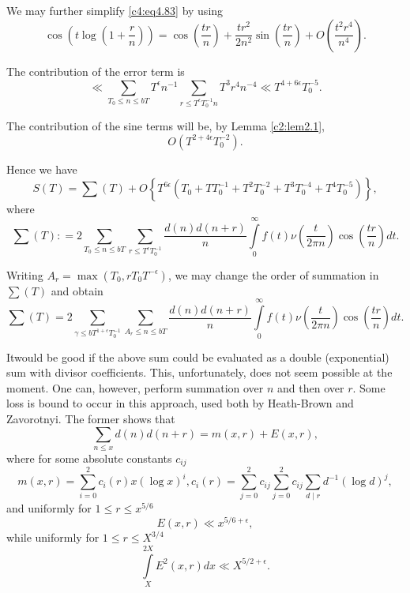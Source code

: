 We may further simplify \eqref{c4:eq4.83} by using
$$
\cos \left(t \log \left(1+ \frac{r}{n}\right) \right) = \cos
\left(\frac{tr}{n} \right) + \frac{tr^2}{2n^2} \sin \left(\frac{tr}{n}
\right) + O \left(\frac{t^2 r^4}{n^4} \right).
$$

The contribution of the error term is 
$$
\ll \sum_{T_0 \leq n \leq bT} T^\epsilon n^{-1} \sum_{r \leq
  T^\epsilon T_0^{-1} n} T^3 r^4 n^{-4} \ll T^{4+ 6 \epsilon} T_0^{-5}. 
$$

The contribution of the sine terms will be, by Lemma \ref{c2:lem2.1},
$$
O(T^{2 + 4\epsilon} T^{-2}_0).
$$ 

Hence we have
{\fontsize{10pt}{12pt}\selectfont
\begin{equation}
  S(T) = \sum (T) + O\left\{ T^{6 \epsilon} \left(T_0 + TT_0^{-1} + T^2
  T_0^{-2} + T^3 T_0^{-4} + T^4 T^{-5}_0\right)\right\}, \label{c4:eq4.84}
\end{equation}}
where
{\fontsize{10pt}{12pt}\selectfont
\begin{equation}
  \sum(T) : = 2 \sum_{T_0 \leq n \leq b T} \sum_{r \leq T^\epsilon
    T_0^{-1}} \frac{d(n) d(n+r)}{n} \int\limits_0^\infty f(t) \nu
  \left(\frac{t}{2 \pi n} \right) \cos \left(\frac{tr}{n}
  \right)dt.\label{c4:eq4.85} 
\end{equation}}

Writing $A_r = \max (T_0, rT_0 T^{-\epsilon})$, we may change the
order of summation in $\sum (T)$ and obtain 
{\fontsize{10pt}{12pt}\selectfont
\begin{equation}
  \sum(T) = 2 \sum_{\gamma \leq b T^{1+ \epsilon} T_0^{-1}} \sum_{A_r
    \leq n \leq b T} \frac{d(n) d (n+r)}{n} \int\limits_0^\infty f(t)
  \nu \left(\frac{t}{2 \pi n} \right) \cos \left(\frac{tr}{n}\right)
  dt.\label{c4:eq4.86}
\end{equation}}

It\pageoriginale would be good if the above sum could be evaluated as
a double (exponential) sum with divisor coefficients. This,
unfortunately, does not seem possible at the moment. One can, however,
perform summation over $n$ and then over $r$. Some loss is bound to
occur in this approach, used both by Heath-Brown and Zavorotnyi. The
former shows that
$$
\sum_{n \leq x} d(n) d(n+r) = m (x, r) + E(x, r),
$$
where for some absolute constants $c_{ij}$
$$
m (x, r) = \sum_{i=0}^2 c_i (r) x (\log x)^i, c_i (r) = \sum^2_{j=0}
c_{ij} \sum_{j=0}^2 c_{ij} \sum_{d \mid r} d^{-1} (\log d)^j,
$$
and uniformly for $1 \leq r \leq x^{5/6}$
\begin{equation}
  E(x, r) \ll x^{5/6+\epsilon}, \label{c4:eq4.87}
\end{equation}
while uniformly for $1 \leq r \leq X^{3/4}$
\begin{equation}
  \int\limits_X^{2X} E^2 (x, r) dx \ll X^{5/2+
    \epsilon}. \label{c4:eq4.88} 
\end{equation}

